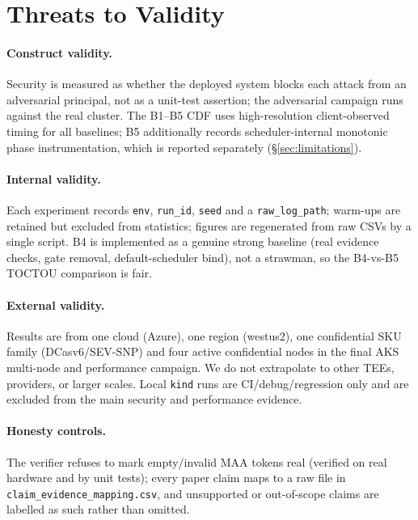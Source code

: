 \section{Threats to Validity}
\label{sec:ttv}

\paragraph{Construct validity.}
Security is measured as whether the deployed system blocks each attack from an
adversarial principal, not as a unit-test assertion; the adversarial campaign
runs against the real cluster. The B1--B5 CDF uses high-resolution
client-observed timing for all baselines; B5 additionally records
scheduler-internal monotonic phase instrumentation, which is reported separately
(\S\ref{sec:limitations}).

\paragraph{Internal validity.}
Each experiment records \texttt{env}, \texttt{run\_id}, \texttt{seed} and a
\texttt{raw\_log\_path}; warm-ups are retained but excluded from statistics;
figures are regenerated from raw CSVs by a single script. B4 is implemented as a
genuine strong baseline (real evidence checks, gate removal, default-scheduler
bind), not a strawman, so the B4-vs-B5 TOCTOU comparison is fair.

\paragraph{External validity.}
Results are from one cloud (Azure), one region (westus2), one confidential SKU
family (DCasv6/SEV-SNP) and four active confidential nodes in the final AKS
multi-node and performance campaign. We do not extrapolate to other TEEs,
providers, or larger scales. Local \texttt{kind} runs are CI/debug/regression
only and are excluded from the main security and performance evidence.

\paragraph{Honesty controls.}
The verifier refuses to mark empty/invalid MAA tokens real (verified on real
hardware and by unit tests); every paper claim maps to a raw file in
\texttt{claim\_evidence\_mapping.csv}, and unsupported or out-of-scope claims are
labelled as such rather than omitted.
